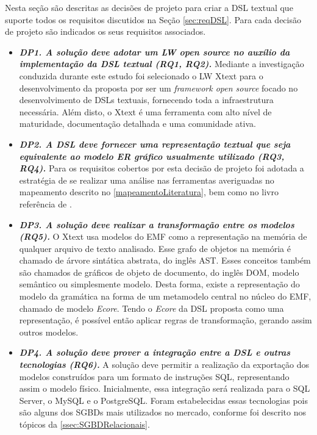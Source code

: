 Nesta seção são descritas as decisões de projeto para criar a \ac{DSL} textual que suporte todos os requisitos discutidos na Seção \ref{sec:reqDSL}. 
Para cada decisão de projeto são indicados os seus requisitos associados.

\begin{itemize}
    \item\textit{\textbf{DP1. A solução deve adotar um \ac{LW} open source no auxílio da implementação da \ac{DSL} textual (RQ1, RQ2).}} 
    Mediante a investigação conduzida durante este estudo foi selecionado o \ac{LW} Xtext para o desenvolvimento da proposta por ser um \textit{framework open source} focado no desenvolvimento de \acp{DSL} textuais, fornecendo toda a infraestrutura necessária. 
    Além disto, o Xtext é uma ferramenta com alto nível de maturidade, documentação detalhada e uma comunidade ativa. 
    
    \item\textit{\textbf{DP2. A \ac{DSL} deve fornecer uma representação textual que seja equivalente ao modelo \ac{ER} gráfico usualmente utilizado (RQ3, RQ4).}} 
    Para os requisitos cobertos por esta decisão de projeto foi adotada a estratégia de se realizar uma análise nas ferramentas averiguadas no mapeamento descrito no \autoref{mapeamentoLiteratura}, bem como no livro referência de .
    
    \item\textit{\textbf{DP3. A solução deve realizar a transformação entre os modelos (RQ5).}} 
    O Xtext usa modelos do \ac{EMF} como a representação na memória de qualquer arquivo de texto analisado. 
    Esse grafo de objetos na memória é chamado de árvore sintática abstrata, do inglês \ac{AST}. 
    Esses conceitos também são chamados de gráficos de objeto de documento, do inglês \ac{DOM}, modelo semântico ou simplesmente modelo. 
    Desta forma, existe a representação do modelo da gramática na forma de um metamodelo central no núcleo do \ac{EMF}, chamado de modelo \textit{Ecore}. 
    Tendo o \textit{Ecore} da \ac{DSL} proposta como uma representação, é possível então aplicar regras de transformação, gerando assim outros modelos.
    
    \item\textit{\textbf{DP4. A solução deve prover a integração entre a \ac{DSL} e outras tecnologias (RQ6).}} 
    A solução deve permitir a realização da exportação dos modelos construídos para um formato de instruções \ac{SQL}, representando assim o modelo físico. 
    Inicialmente, essa integração será realizada para o SQL Server, o MySQL e o PostgreSQL. 
    Foram estabelecidas essas tecnologias pois são alguns dos \acp{SGBD} mais utilizados no mercado, conforme foi descrito nos tópicos da \autoref{ssec:SGBDRelacionais}.
\end{itemize}


